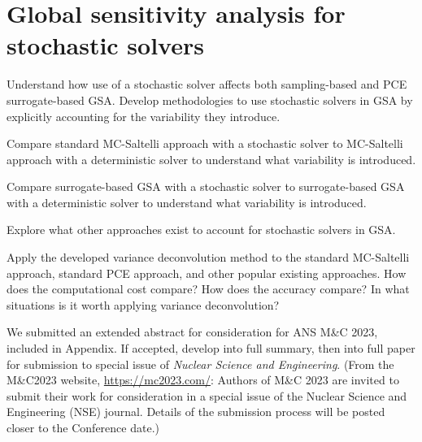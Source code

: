 \section{Global sensitivity analysis for stochastic solvers}
 Understand how use of a stochastic solver affects both sampling-based and PCE surrogate-based GSA. Develop methodologies to use stochastic solvers in GSA by explicitly accounting for the variability they introduce.
\begin{todolist}
    \item Compare standard MC-Saltelli approach with a stochastic solver to MC-Saltelli approach with a deterministic solver to understand what variability is introduced.
    \item Compare surrogate-based GSA with a stochastic solver to surrogate-based GSA with a deterministic solver to understand what variability is introduced.
    \item Explore what other approaches exist to account for stochastic solvers in GSA. 
    \item Apply the developed variance deconvolution method to the standard MC-Saltelli approach, standard PCE approach, and other popular existing approaches. How does the computational cost compare? How does the accuracy compare? In what situations is it worth applying variance deconvolution? 
\end{todolist}
We submitted an extended abstract for consideration for ANS M\&C 2023, included in Appendix. If accepted, develop into full summary, then into full paper for submission to special issue of \textit{Nuclear Science and Engineering}. (From the M\&C2023 website, \url{https://mc2023.com/}: Authors of M\&C 2023 are invited to submit their work for consideration in a special issue of the Nuclear Science and Engineering (NSE) journal. Details of the submission process will be posted closer to the Conference date.)


